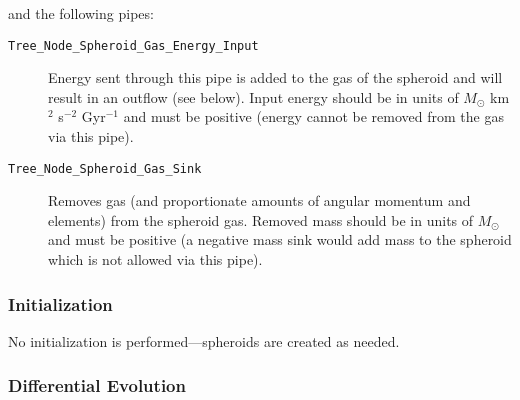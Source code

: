 and the following pipes:
\begin{description}
 \item [{\tt Tree\_Node\_Spheroid\_Gas\_Energy\_Input}] Energy sent through this pipe is added to the gas of the spheroid and will result in an outflow (see below). Input energy should be in units of $M_\odot$ km$^2$ s$^{-2}$ Gyr$^{-1}$ and must be positive (energy cannot be removed from the gas via this pipe).
 \item [{\tt Tree\_Node\_Spheroid\_Gas\_Sink}] Removes gas (and proportionate amounts of angular momentum and elements) from the spheroid gas. Removed mass should be in units of $M_\odot$ and must be positive (a negative mass sink would add mass to the spheroid which is not allowed via this pipe).
\end{description}

\subsubsection{Initialization}

No initialization is performed---spheroids are created as needed.

\subsubsection{Differential Evolution}

